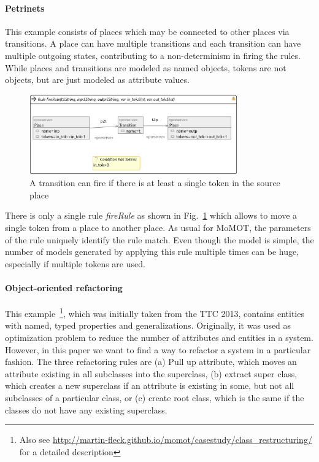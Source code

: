 \paragraph{Petrinets} 
This example consists of places which may be connected to other places via transitions. A place can have multiple transitions
and each transition can have multiple outgoing states, contributing to a non-determinism in firing the rules.
While places and transitions are modeled as named objects, tokens are not objects, but are just modeled as attribute values.


\begin{figure}
\includegraphics[width=0.8\textwidth]{images/firetransition.png}
\caption{A transition can fire if there is at least a single token in the source place}
\label{fig:firerule}
\end{figure}

There is only a single rule \textit{fireRule} as shown in Fig.~\ref{fig:firerule} which allows to move a single token from a place to another place. 
As usual for MoMOT, the parameters of the rule uniquely identify the rule match. Even though the model is simple, the number of models generated
by applying this rule multiple times can be huge, especially if multiple tokens are used.

\paragraph{Object-oriented refactoring}

This example~\footnote{Also see \url{http://martin-fleck.github.io/momot/casestudy/class_restructuring/} for a detailed description}, which was initially taken from the TTC 2013, contains entities with named, typed properties and generalizations. 
Originally, it was used as optimization problem to reduce the number of attributes and entities in a system. However, in this paper
we want to find a way to refactor a system in a particular fashion. The three refactoring rules are (a) Pull up attribute, which moves an attribute existing in all subclasses into the superclass, (b) extract super class, which creates a new superclass if an attribute is existing in some, but not all subclasses of a particular class, or (c) create root class, which is the same if the classes do not have any existing superclass.


